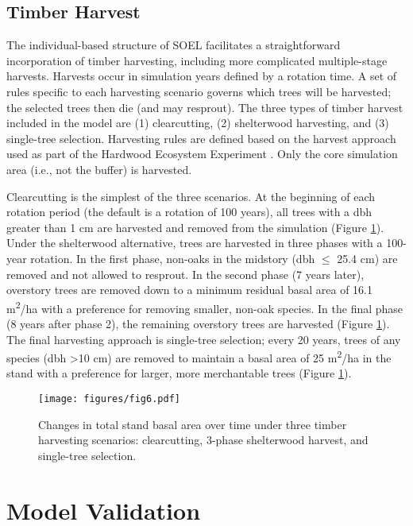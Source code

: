 \documentclass[
11pt, %
a4paper, %
oneside, %
headinclude,footinclude, %
]{scrartcl}
\begin{document}
\subsection{Timber Harvest}

The individual-based structure of SOEL facilitates a straightforward incorporation of timber harvesting, including more complicated multiple-stage harvests. Harvests occur in simulation years defined by a rotation time. A set of rules specific to each harvesting scenario governs which trees will be harvested; the selected trees then die (and may resprout). The three types of timber harvest included in the model are (1) clearcutting, (2) shelterwood harvesting, and (3) single-tree selection. Harvesting rules are defined based on the harvest approach used as part of the Hardwood Ecosystem Experiment \citep{Kalb2013}. Only the core simulation area (i.e., not the buffer) is harvested.

Clearcutting is the simplest of the three scenarios. At the beginning of each rotation period (the default is a rotation of 100 years), all trees with a dbh greater than 1 cm are harvested and removed from the simulation (Figure \ref{fig:6}). Under the shelterwood alternative, trees are harvested in three phases with a 100-year rotation. In the first phase, non-oaks in the midstory (dbh $\leq$ 25.4 cm) are removed and not allowed to resprout. In the second phase (7 years later), overstory trees are removed down to a minimum residual basal area of 16.1 m\textsuperscript{2}/ha with a preference for removing smaller, non-oak species. In the final phase (8 years after phase 2), the remaining overstory trees are harvested (Figure \ref{fig:6}). The final harvesting approach is single-tree selection; every 20 years, trees of any species (dbh \textgreater 10 cm) are removed to maintain a basal area of 25 m\textsuperscript{2}/ha in the stand with a preference for larger, more merchantable trees (Figure \ref{fig:6}).

\begin{figure}
	\centering
	\texttt{[image: figures/fig6.pdf]}
	\caption{Changes in total stand basal area over time under three timber harvesting scenarios: clearcutting, 3-phase shelterwood harvest, and single-tree selection.}
	\label{fig:6}
\end{figure}

\section{Model Validation}
\end{document}
